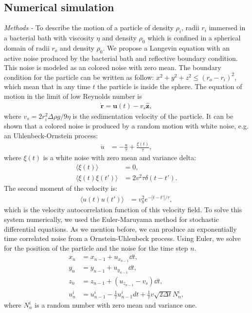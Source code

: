 \documentclass[%
10pt,
superscriptaddress,
twocolumn,
 amsmath,amssymb,
 aps,prx,
]{revtex4-2}
\begin{document}
\subsection{Numerical simulation}
\textit{Methods - }To describe the motion of a particle of density $\rho_i$, radii $r_i$ immersed in a bacterial bath with viscosity $\eta$ and density $\rho_0$ which is confined in a spherical domain of radii $r_o$ and density $\rho_0$.
We propose a Langevin equation with an active noise produced by the bacterial bath and reflective boundary condition. 
This noise is modeled as an colored noise with zero mean.
The boundary condition for the particle can be written as follow: $x^2+y^2+z^2\leq (r_o-r_i)^2$, which mean that in any time $t$ the particle is inside the sphere.  
The equation of motion in the limit of low Reynolds number is 
\begin{align}\label{eq.Langevin_num}
  \mathbf{\dot{r}}=\mathbf{u}(t)-v_s\mathbf{\hat{z}},
\end{align}
where  $v_s=2 r_i^2 \Delta\rho g/9\eta$ is the sedimentation velocity of the particle.
It can be shown that a colored noise is produced by a random motion with white noise, e.g. an Uhlenbeck-Ornstein process:
\begin{align}\label{OUP}
  \dot{u}&=-\frac{u}{\tau}+\frac{\xi(t)}{\tau},
\end{align}
where $\xi(t)$ is a white noise with zero mean and variance delta:
\begin{align}
  \langle \xi(t)\rangle &=0,\\
  \langle \xi(t)\xi(t')\rangle &=2v^2\tau\delta(t-t').
\end{align}
The second moment of the velocity is:
\begin{align}
  \langle u(t)u(t')\rangle &=v_b^2e^{-|t-t'|/\tau},
\end{align}
which is the velocity autocorrelation function of this velocity field.
To solve this system numerically, we used the Euler-Maruyama method for stochastic differential equations.
As we mention before, we can produce an exponentially time correlated noise from a Ornstein-Uhlenbeck process.
Using Euler, we solve for the position of the particle and the noise for the time step $n$.
\begin{align}
   \label{eq:Euler_method}
   x_n&=x_{n-1}+u_{x_{n-1}}\dd t,\\
   y_n&=y_{n-1}+u_{y_{n-1}}\dd t,\\
   z_n&=z_{n-1}+(u_{z_{n-1}}-v_s)\dd t,\\
   u^i_{n}&=u^i_{n-1}-\frac{1}{\tau}u^i_{n-1}dt+\frac{1}{\tau}v\sqrt{2\Delta t}N^i_{n},
\end{align}
where $N^{i}_n$ is a random number with zero mean and variance one.
\end{document}

